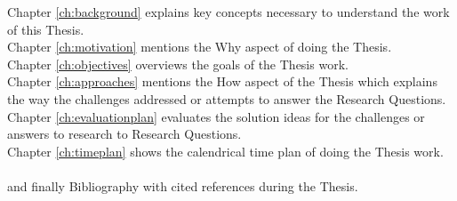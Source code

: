 \noindent Chapter \ref{ch:background} explains key concepts necessary to understand the work of this Thesis. \\ 
Chapter \ref{ch:motivation} mentions the Why aspect of doing the Thesis. \\
Chapter \ref{ch:objectives} overviews the goals of the Thesis work. \\
Chapter \ref{ch:approaches} mentions the How aspect of the Thesis which explains the way the challenges addressed or attempts to answer the Research Questions. \\
Chapter \ref{ch:evaluationplan} evaluates the solution ideas for the challenges or answers to research to Research Questions. \\
Chapter \ref{ch:timeplan} shows the calendrical time plan of doing the Thesis work. \\ \\

and finally Bibliography with cited references during the Thesis.

\let\cleardoublepage\clearpage
